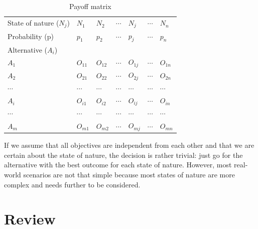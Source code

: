 \documentclass[
  12pt,
  oneside]{book}
\theoremstyle{definition}
\theoremstyle{definition}
\theoremstyle{definition}
\theoremstyle{definition}
\theoremstyle{remark}
\begin{document}
\begin{longtable}[]{@{}
  >{\raggedright\arraybackslash}p{}
  >{\raggedright\arraybackslash}p{}
  >{\raggedright\arraybackslash}p{}
  >{\raggedright\arraybackslash}p{}
  >{\raggedright\arraybackslash}p{}
  >{\raggedright\arraybackslash}p{}
  >{\raggedright\arraybackslash}p{}@{}}
\caption{Payoff matrix}\tabularnewline
\toprule\noalign{}
\endfirsthead
\endhead
\bottomrule\noalign{}
\endlastfoot
State of nature (\(N_j\)) & \(N_1\) & \(N_2\) & \(\cdots\) & \(N_j\) & \(\cdots\) & \(N_n\) \\
Probability (p) & \(p_1\) & \(p_2\) & \(\cdots\) & \(p_j\) & \(\cdots\) & \(p_n\) \\
Alternative (\(A_i\)) & & & & & & \\
\(A_1\) & \(O_{11}\) & \(O_{12}\) & \(\cdots\) & \(O_{1j}\) & \(\cdots\) & \(O_{1n}\) \\
\(A_2\) & \(O_{21}\) & \(O_{22}\) & \(\cdots\) & \(O_{2j}\) & \(\cdots\) & \(O_{2n}\) \\
\(\cdots\) & \(\cdots\) & \(\cdots\) & \(\cdots\) & \(\cdots\) & \(\cdots\) & \(\cdots\) \\
\(A_i\) & \(O_{i1}\) & \(O_{i2}\) & \(\cdots\) & \(O_{ij}\) & \(\cdots\) & \(O_{in}\) \\
\(\cdots\) & \(\cdots\) & \(\cdots\) & \(\cdots\) & \(\cdots\) & \(\cdots\) & \(\cdots\) \\
\(A_m\) & \(O_{m1}\) & \(O_{m2}\) & \(\cdots\) & \(O_{mj}\) & \(\cdots\) & \(O_{mn}\) \\
\end{longtable}

If we assume that all objectives are independent from each other and that we are certain about the state of nature, the decision is rather trivial: just go for the alternative with the best outcome for each state of nature. However, most real-world scenarios are not that simple because most states of nature are more complex and needs further to be considered.

\section{Review}\label{review}
\end{document}
